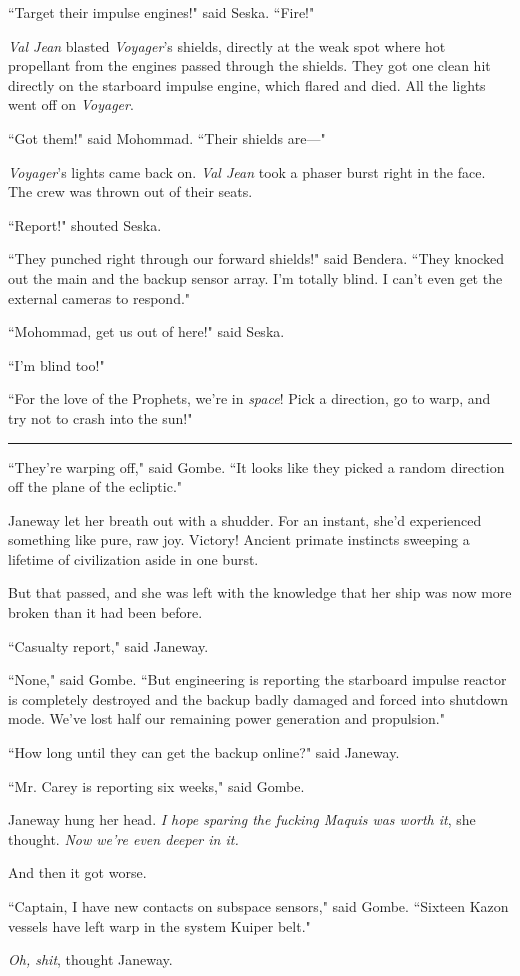 \documentclass[twoside,letterpaper,12pt]{memoir}
\begin{document}
``Target their impulse engines!" said Seska. ``Fire!"

\textit{Val Jean} blasted \textit{Voyager}'s shields, directly at the weak spot where hot propellant from the engines passed through the shields. They got one clean hit directly on the starboard impulse engine, which flared and died. All the lights went off on \textit{Voyager}.

``Got them!" said Mohommad. ``Their shields are---"

\textit{Voyager}'s lights came back on. \textit{Val Jean} took a phaser burst right in the face. The crew was thrown out of their seats.

``Report!" shouted Seska.

``They punched right through our forward shields!" said Bendera. ``They knocked out the main and the backup sensor array. I'm totally blind. I can't even get the external cameras to respond."

``Mohommad, get us out of here!" said Seska.

``I'm blind too!"

``For the love of the Prophets, we're in \textit{space}! Pick a direction, go to warp, and try not to crash into the sun!"

\begin{center}\rule{3cm}{0.4 pt}\end{center}

\noindent ``They're warping off," said Gombe. ``It looks like they picked a random direction off the plane of the ecliptic."

Janeway let her breath out with a shudder. For an instant, she'd experienced something like pure, raw joy. Victory! Ancient primate instincts sweeping a lifetime of civilization aside in one burst.

But that passed, and she was left with the knowledge that her ship was now more broken than it had been before.

``Casualty report," said Janeway.

``None," said Gombe. ``But engineering is reporting the starboard impulse reactor is completely destroyed and the backup badly damaged and forced into shutdown mode. We've lost half our remaining power generation and propulsion."

``How long until they can get the backup online?" said Janeway.

``Mr. Carey is reporting six weeks," said Gombe.

Janeway hung her head. \textit{I hope sparing the fucking Maquis was worth it}, she thought. \textit{Now we're even deeper in it.}

And then it got worse.

``Captain, I have new contacts on subspace sensors," said Gombe. ``Sixteen Kazon vessels have left warp in the system Kuiper belt."

\textit{Oh, shit}, thought Janeway.
\end{document}
